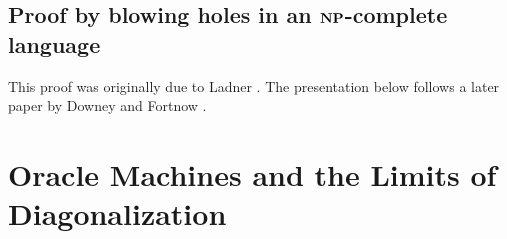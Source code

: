 \documentclass[11pt,twoside=off,numbers=noenddot]{scrbook}
\begin{document}
\subsection{Proof by blowing holes in an $\textbf{NP}$-complete language}
This proof was originally due to Ladner \cite{ladner1975structure}. The presentation below follows a later paper by Downey and Fortnow \cite{downey2003uniformly}.

\section{Oracle Machines and the Limits of Diagonalization}

\printbibliography[nottype=image]
\end{document}
